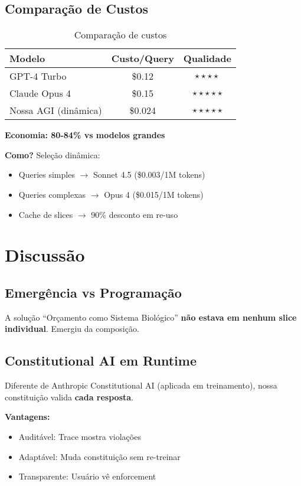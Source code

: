 \documentclass[11pt]{article}
\begin{document}
\subsection{Comparação de Custos}

\begin{table}[H]
\centering
\begin{tabular}{@{}lcc@{}}
\toprule
\textbf{Modelo} & \textbf{Custo/Query} & \textbf{Qualidade} \\ \midrule
GPT-4 Turbo & \$0.12 & $\star\star\star\star$ \\
Claude Opus 4 & \$0.15 & $\star\star\star\star\star$ \\
Nossa AGI (dinâmica) & \$0.024 & $\star\star\star\star\star$ \\ \bottomrule
\end{tabular}
\caption{Comparação de custos}
\end{table}

\textbf{Economia: 80-84\% vs modelos grandes}

\textbf{Como?} Seleção dinâmica:
\begin{itemize}
    \item Queries simples $\rightarrow$ Sonnet 4.5 (\$0.003/1M tokens)
    \item Queries complexas $\rightarrow$ Opus 4 (\$0.015/1M tokens)
    \item Cache de slices $\rightarrow$ 90\% desconto em re-uso
\end{itemize}

\section{Discussão}

\subsection{Emergência vs Programação}

A solução ``Orçamento como Sistema Biológico'' \textbf{não estava em nenhum slice individual}. Emergiu da composição.

\subsection{Constitutional AI em Runtime}

Diferente de Anthropic Constitutional AI (aplicada em treinamento), nossa constituição valida \textbf{cada resposta}.

\textbf{Vantagens:}
\begin{itemize}
    \item Auditável: Trace mostra violações
    \item Adaptável: Muda constituição sem re-treinar
    \item Transparente: Usuário vê enforcement
\end{itemize}
\end{document}
